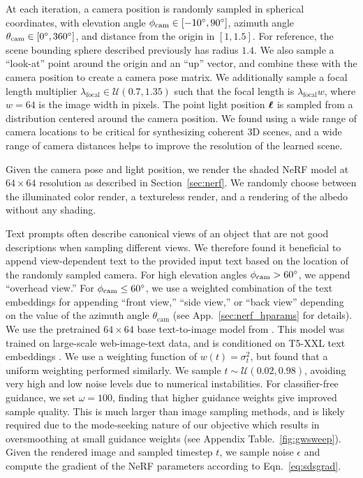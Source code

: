 \documentclass{article} %
\newcommand{\el}{\phi_{\textrm{cam}}}
\newcommand{\az}{\theta_{\textrm{cam}}}
\begin{document}
 At each iteration, a camera position is randomly sampled in spherical coordinates, with elevation angle $\el \in [-10\degree, 90\degree]$, azimuth angle $\az \in [0\degree, 360\degree]$, and distance from the origin in $[1, 1.5]$. For reference, the scene bounding sphere described previously has radius $1.4$. We also sample a ``look-at'' point around the origin and an ``up'' vector, and combine these with the camera position to create a camera pose matrix. We additionally sample a focal length multiplier $\lambda_\mathrm{focal} \in \mathcal U(0.7, 1.35)$ such that the focal length is $\lambda_\mathrm{focal}w$, where $w=64$ is the image width in pixels. The point light position $\boldsymbol{\ell}$ is sampled from a distribution centered around the camera position. We found using a wide range of camera locations to be critical for synthesizing coherent 3D scenes, and a wide range of camera distances helps to improve the resolution of the learned scene.

Given the camera pose and light position, we render the shaded NeRF model at $64\times 64$ resolution as described in Section~\ref{sec:nerf}. We randomly choose between the illuminated color render, a textureless render, and a rendering of the albedo without any shading.%

Text prompts often describe canonical views of an object that are not good descriptions when sampling different views. We therefore found it beneficial to append view-dependent text to the provided input text based on the location of the randomly sampled camera. For high elevation angles $\el > 60\degree$, we append ``overhead view.'' For $\el \leq 60\degree$, we use a weighted combination of the text embeddings for appending ``front view,'' ``side view,'' or ``back view'' depending on the value of the azimuth angle $\az$ (see App.~\ref{sec:nerf_hparams} for details).
We use the pretrained $64\times64$ base text-to-image model from \citet{imagen}. This model was trained on large-scale web-image-text data, and is conditioned on T5-XXL text embeddings \citep{2020t5}. We use a weighting function of $w(t) = \sigma_t^2$, but found that a uniform weighting performed similarly. We sample $t \sim \mathcal{U}(0.02, 0.98)$, avoiding very high and low noise levels due to numerical instabilities. For classifier-free guidance, we set $\omega=100$, finding that higher guidance weights give improved sample quality. This is much larger than image sampling methods, and is likely required due to the mode-seeking nature of our objective which results in oversmoothing at small guidance weights (see Appendix Table.~\ref{fig:gwsweep}). Given the rendered image and sampled timestep $t$, we sample noise $\epsilon$ and compute the gradient of the NeRF parameters  according to Eqn.~\ref{eq:sdsgrad}.
\end{document}
